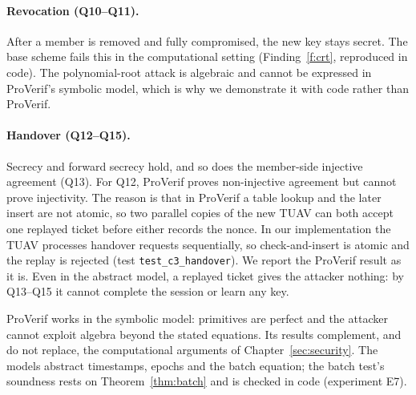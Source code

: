 \paragraph{Revocation (Q10--Q11).} After a member is removed and fully compromised, the new key stays secret. The base scheme fails this in the
computational setting (Finding~\ref{f:crt}, reproduced in code). The polynomial-root attack is algebraic and cannot be expressed in ProVerif's symbolic
model, which is why we demonstrate it with code rather than ProVerif.

\paragraph{Handover (Q12--Q15).} Secrecy and forward secrecy hold, and so does the member-side injective agreement (Q13). For Q12, ProVerif proves
non-injective agreement but cannot prove injectivity. The reason is that in ProVerif a table lookup and the later insert are not atomic, so two parallel
copies of the new TUAV can both accept one replayed ticket before either records the nonce. In our implementation the TUAV processes handover requests
sequentially, so check-and-insert is atomic and the replay is rejected (test \texttt{test\_c3\_handover}). We report the ProVerif result as it is. Even in the
abstract model, a replayed ticket gives the attacker nothing: by Q13--Q15 it cannot complete the session or learn any key.

\begin{limitbox}
ProVerif works in the symbolic model: primitives are perfect and the attacker cannot exploit algebra beyond the stated equations. Its results complement,
and do not replace, the computational arguments of Chapter~\ref{sec:security}. The models abstract timestamps, epochs and the batch equation; the batch
test's soundness rests on Theorem~\ref{thm:batch} and is checked in code (experiment E7).
\end{limitbox}
